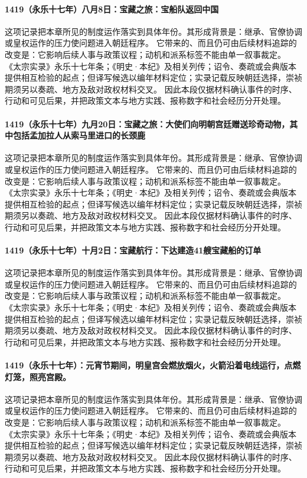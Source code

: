 \paragraph{1419（永乐十七年）八月8日：宝藏之旅：宝船队返回中国} 这项记录把本章所见的制度运作落实到具体年份。其形成背景是：继承、官僚协调或皇权运作的压力使问题进入朝廷程序。 它带来的、而且仍可由后续材料追踪的改变是：它影响后续人事与政策议程；动机和派系标签不能由单一叙事裁定。 《太宗实录》永乐十七年条；《明史·本纪》及相关列传；诏令、奏疏或会典版本 提供相互检验的起点；但译写候选以编年材料定位；实录记载反映朝廷选择，崇祯期须另以奏疏、地方及敌对政权材料交叉。 因此本段仅据材料确认事件的时序、行动和可见后果，并把政策文本与地方实践、报称数字和社会经历分开处理。

\paragraph{1419（永乐十七年）九月20日：宝藏之旅：大使们向明朝宫廷赠送珍奇动物，其中包括孟加拉人从索马里进口的长颈鹿} 这项记录把本章所见的制度运作落实到具体年份。其形成背景是：继承、官僚协调或皇权运作的压力使问题进入朝廷程序。 它带来的、而且仍可由后续材料追踪的改变是：它影响后续人事与政策议程；动机和派系标签不能由单一叙事裁定。 《太宗实录》永乐十七年条；《明史·本纪》及相关列传；诏令、奏疏或会典版本 提供相互检验的起点；但译写候选以编年材料定位；实录记载反映朝廷选择，崇祯期须另以奏疏、地方及敌对政权材料交叉。 因此本段仅据材料确认事件的时序、行动和可见后果，并把政策文本与地方实践、报称数字和社会经历分开处理。

\paragraph{1419（永乐十七年）十月2日：宝藏航行：下达建造41艘宝藏船的订单} 这项记录把本章所见的制度运作落实到具体年份。其形成背景是：继承、官僚协调或皇权运作的压力使问题进入朝廷程序。 它带来的、而且仍可由后续材料追踪的改变是：它影响后续人事与政策议程；动机和派系标签不能由单一叙事裁定。 《太宗实录》永乐十七年条；《明史·本纪》及相关列传；诏令、奏疏或会典版本 提供相互检验的起点；但译写候选以编年材料定位；实录记载反映朝廷选择，崇祯期须另以奏疏、地方及敌对政权材料交叉。 因此本段仅据材料确认事件的时序、行动和可见后果，并把政策文本与地方实践、报称数字和社会经历分开处理。

\paragraph{1419（永乐十七年）：元宵节期间，明皇宫会燃放烟火，火箭沿着电线运行，点燃灯笼，照亮宫殿。} 这项记录把本章所见的制度运作落实到具体年份。其形成背景是：继承、官僚协调或皇权运作的压力使问题进入朝廷程序。 它带来的、而且仍可由后续材料追踪的改变是：它影响后续人事与政策议程；动机和派系标签不能由单一叙事裁定。 《太宗实录》永乐十七年条；《明史·本纪》及相关列传；诏令、奏疏或会典版本 提供相互检验的起点；但译写候选以编年材料定位；实录记载反映朝廷选择，崇祯期须另以奏疏、地方及敌对政权材料交叉。 因此本段仅据材料确认事件的时序、行动和可见后果，并把政策文本与地方实践、报称数字和社会经历分开处理。

